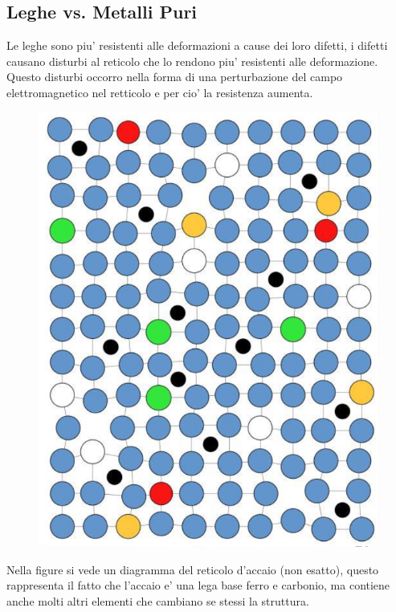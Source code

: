 \documentclass{article}
\begin{document}
        \subsection{Leghe vs. Metalli Puri}
            Le leghe sono piu' resistenti alle deformazioni a cause dei loro difetti, i difetti causano disturbi al reticolo che lo rendono piu' resistenti alle deformazione.
            Questo disturbi occorro nella forma di una perturbazione del campo elettromagnetico nel retticolo e per cio' la resistenza aumenta.
            \begin{figure}[ht]
                \centering
                \includegraphics[width=.75\linewidth]{Reticolo Accaio.png}
            \end{figure}
            Nella figure si vede un diagramma del reticolo d'accaio (non esatto), questo rappresenta il fatto che l'accaio e' una lega base ferro e carbonio, ma contiene anche molti 
            altri elementi che cambiano se stessi la struttura.
\end{document}
